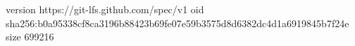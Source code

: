 version https://git-lfs.github.com/spec/v1
oid sha256:b0a95338cf8ca3196b88423b69fe07e59b3575d8d6382dc4d1a6919845b7f24e
size 699216
